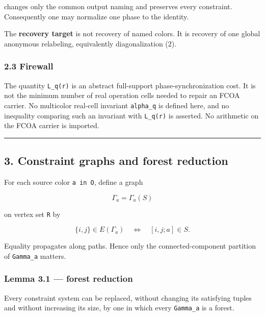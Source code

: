 changes only the common output naming and preserves every constraint.
Consequently one may normalize one phase to the identity.

The \textbf{recovery target} is not recovery of named colors. It is
recovery of one global anonymous relabeling, equivalently
diagonalization (2).

\hypertarget{firewall}{%
\subsubsection{2.3 Firewall}\label{firewall}}

The quantity \texttt{L\_q(r)} is an abstract full-support
phase-synchronization cost. It is not the minimum number of real
operation cells needed to repair an FCOA carrier. No multicolor
real-cell invariant \texttt{alpha\_q} is defined here, and no inequality
comparing such an invariant with \texttt{L\_q(r)} is asserted. No
arithmetic on the FCOA carrier is imported.

\begin{center}\rule{0.5\linewidth}{0.5pt}\end{center}

\hypertarget{constraint-graphs-and-forest-reduction}{%
\subsection{3. Constraint graphs and forest
reduction}\label{constraint-graphs-and-forest-reduction}}

For each source color \texttt{a\ in\ O}, define a graph

\[
\Gamma_a=\Gamma_a(S)
\]

on vertex set \texttt{R} by

\[
\{i,j\}\in E(\Gamma_a)
\quad\Longleftrightarrow\quad
[i,j;a]\in S.
\tag{8}
\]

Equality propagates along paths. Hence only the connected-component
partition of \texttt{Gamma\_a} matters.

\hypertarget{lemma-3.1-forest-reduction}{%
\subsubsection{Lemma 3.1 --- forest
reduction}\label{lemma-3.1-forest-reduction}}

Every constraint system can be replaced, without changing its satisfying
tuples and without increasing its size, by one in which every
\texttt{Gamma\_a} is a forest.

